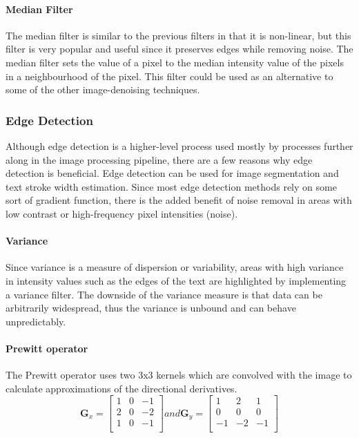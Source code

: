 \documentclass[a4paper, 12pt]{report}
\begin{document}
\paragraph{Median Filter}
The median filter is similar to the previous filters in that it is non-linear,
but this filter is very popular and useful since it preserves edges while
removing noise. The median filter sets the value of a pixel to the median
intensity value of the pixels in a neighbourhood of the pixel. This filter
could be used as an alternative to some of the other image-denoising
techniques.

\subsubsection{Edge Detection}
Although edge detection is a higher-level process used mostly by processes
further along in the image processing pipeline, there are a few reasons why
edge detection is beneficial. Edge detection can be used for image segmentation
and text stroke width estimation. Since most edge detection methods rely on
some sort of gradient function, there is the added benefit of noise removal in
areas with low contrast or high-frequency pixel intensities (noise).

\paragraph{Variance}
Since variance is a measure of dispersion or variability, areas with high
variance in intensity values such as the edges of the text are highlighted by
implementing a variance filter. The downside of the variance measure is that
data can be arbitrarily widespread, thus the variance is unbound and can behave
unpredictably.

\paragraph{Prewitt operator}
The Prewitt operator uses two 3x3 kernels which are convolved with the image to
calculate approximations of the directional derivatives.
\[\mathbf{G}_x=\begin{bmatrix}
        1 & 0 & -1 \\
        2 & 0 & -2 \\
        1 & 0 & -1 \\
    \end{bmatrix} and
    \mathbf{G}_y=\begin{bmatrix}
        1  & 2  & 1  \\
        0  & 0  & 0  \\
        -1 & -2 & -1 \\
    \end{bmatrix}
\]
\end{document}
